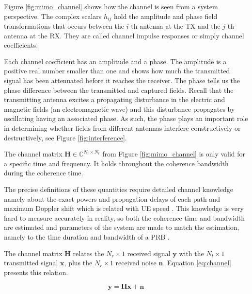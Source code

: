 Figure \ref{fig:mimo_channel} shows how the channel is seen from a system perspective. The complex scalars $h_{ij}$ hold the amplitude and phase field transformations that occurs between the $i$-th antenna at the \ac{TX} and the $j$-th antenna at the \ac{RX}. They are called channel impulse responses or simply channel coefficients.


Each channel coefficient has an amplitude and a phase. The amplitude is a positive real number smaller than one and shows how much the transmitted signal has been attenuated before it reaches the receiver. The phase tells us the phase difference between the transmitted and captured fields. Recall that the transmitting antenna excites a propagating disturbance in the electric and magnetic fields (an electromagnetic wave) and this disturbance propagates by oscillating having an associated phase. As such, the phase plays an important role in determining whether fields from different antennas interfere constructively or destructively, see Figure \ref{fig:interference}.



The channel matrix $\bm{H} \in \mathbb{C}^{N_r \times N_t}$ from Figure \ref{fig:mimo_channel} is only valid for a specific time and frequency. It holds throughout the coherence bandwidth during the coherence time. 

The precise definitions of these quantities require detailed channel knowledge namely about the exact powers and propagation delays of each path and maximum Doppler shift which is related with \ac{UE} speed \cite{Rappaport_wireless_coms,wireless_coms_andrea_goldsmith}. This knowledge is very hard to measure accurately in reality, so both the coherence time and bandwidth are estimated and parameters of the system are made to match the estimation, namely to the time duration and bandwidth of a \ac{PRB} \cite{fundamentals_wireless_david_tse}.

The channel matrix $\bm{H}$ relates the $N_r \times 1$ received signal $\bm{y}$ with the $N_t \times 1$ transmitted signal $\bm{x}$, plus the $N_r \times 1$ received noise $\bm{n}$. Equation \eqref{eq:channel} presents this relation.


\begin{equation} \label{eq:channel}
    \bm{y} = \bm{H} \bm{x} + \bm{n}
\end{equation}


